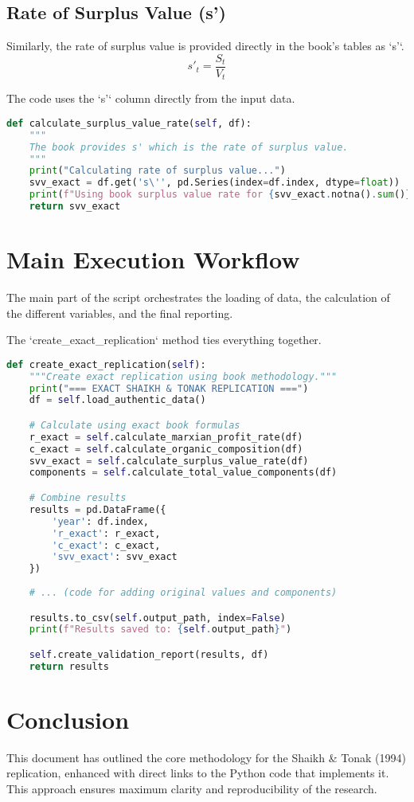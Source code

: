 \documentclass[12pt,a4paper]{article}
\begin{document}
\subsection{Rate of Surplus Value (s')}
Similarly, the rate of surplus value is provided directly in the book's tables as `s'`.
\begin{equation}
s'_t = \frac{S_t}{V_t}
\end{equation}

\begin{tcolorbox}[colback=purple!5!white,colframe=purple!75!black,title=Implementation for Rate of Surplus Value]
The code uses the `s'` column directly from the input data.
\begin{lstlisting}[language=Python, caption=Rate of Surplus Value, label=code:surplus_value_rate]
def calculate_surplus_value_rate(self, df):
    """
    The book provides s' which is the rate of surplus value.
    """
    print("Calculating rate of surplus value...")
    svv_exact = df.get('s\'', pd.Series(index=df.index, dtype=float))
    print(f"Using book surplus value rate for {svv_exact.notna().sum()} years")
    return svv_exact
\end{lstlisting}
\end{tcolorbox}

\section{Main Execution Workflow}
The main part of the script orchestrates the loading of data, the calculation of the different variables, and the final reporting.

\begin{tcolorbox}[colback=gray!5!white,colframe=gray!75!black,title=Main Execution Block]
The `create_exact_replication` method ties everything together.
\begin{lstlisting}[language=Python, caption=Main Execution Workflow, label=code:main_execution]
def create_exact_replication(self):
    """Create exact replication using book methodology."""
    print("=== EXACT SHAIKH & TONAK REPLICATION ===")
    df = self.load_authentic_data()

    # Calculate using exact book formulas
    r_exact = self.calculate_marxian_profit_rate(df)
    c_exact = self.calculate_organic_composition(df)
    svv_exact = self.calculate_surplus_value_rate(df)
    components = self.calculate_total_value_components(df)

    # Combine results
    results = pd.DataFrame({
        'year': df.index,
        'r_exact': r_exact,
        'c_exact': c_exact,
        'svv_exact': svv_exact
    })
    
    # ... (code for adding original values and components)

    results.to_csv(self.output_path, index=False)
    print(f"Results saved to: {self.output_path}")

    self.create_validation_report(results, df)
    return results
\end{lstlisting}
\end{tcolorbox}

\section{Conclusion}
This document has outlined the core methodology for the Shaikh \& Tonak (1994) replication, enhanced with direct links to the Python code that implements it. This approach ensures maximum clarity and reproducibility of the research.
\end{document}
